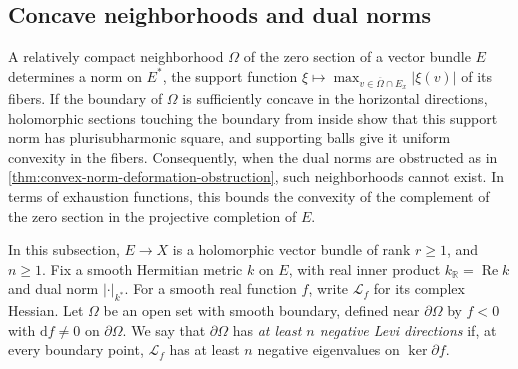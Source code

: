 \subsection{Concave neighborhoods and dual norms}
\label{subsec:concave-neighbourhood-dual-norms}

A relatively compact neighborhood $\Omega$ of the zero section of a vector bundle $E$ determines a norm on $E^*$, the support function $\xi\mapsto\max_{v\in\overline\Omega\cap E_x}|\xi(v)|$ of its fibers. If the boundary of $\Omega$ is sufficiently concave in the horizontal directions, holomorphic sections touching the boundary from inside show that this support norm has plurisubharmonic square, and supporting balls give it uniform convexity in the fibers. Consequently, when the dual norms are obstructed as in \cref{thm:convex-norm-deformation-obstruction}, such neighborhoods cannot exist. In terms of exhaustion functions, this bounds the convexity of the complement of the zero section in the projective completion of $E$.

In this subsection, $E\to X$ is a holomorphic vector bundle of rank $r\geq1$, and $n\geq1$. Fix a smooth Hermitian metric $k$ on $E$, with real inner product $k_{\mathbb R}=\operatorname{Re}k$ and dual norm $|\cdot|_{k^*}$. For a smooth real function $f$, write $\mathcal L_f$ for its complex Hessian. Let $\Omega$ be an open set with smooth boundary, defined near $\partial\Omega$ by $f<0$ with $\mathrm df\ne0$ on $\partial\Omega$. We say that $\partial\Omega$ has \emph{at least $n$ negative Levi directions} if, at every boundary point, $\mathcal L_f$ has at least $n$ negative eigenvalues on $\ker\partial f$.

